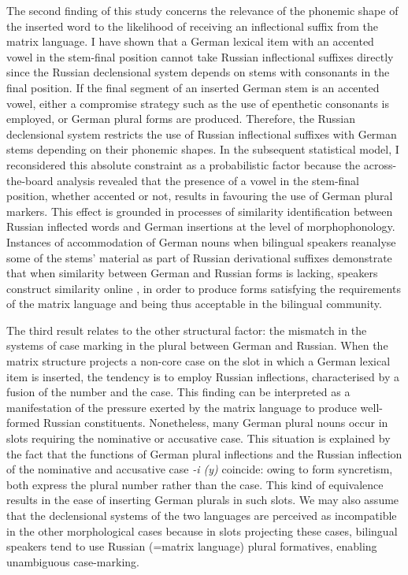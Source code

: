 The second finding of this study concerns the relevance of the phonemic shape of the inserted word to the likelihood of receiving an inflectional suffix from the matrix language. I have shown that a German lexical item with an accented vowel in the stem-final position cannot take Russian inflectional suffixes directly since the Russian declensional system depends on stems with consonants in the final position. If the final segment of an inserted German stem is an accented vowel, either a compromise strategy such as the use of epenthetic consonants is employed, or German plural forms are produced. Therefore, the Russian declensional system restricts the use of Russian inflectional suffixes with German stems depending on their phonemic shapes. In the subsequent statistical model, I reconsidered this absolute constraint as a probabilistic factor because the across-the-board analysis revealed that the presence of a vowel in the stem-final position, whether accented or not, results in favouring the use of German plural markers. This effect is grounded in processes of similarity identification between Russian inflected words and German insertions at the level of morphophonology. Instances of accommodation of German nouns when bilingual speakers reanalyse some of the stems' material as part of Russian derivational suffixes demonstrate that when similarity between German and Russian forms is lacking, speakers construct similarity online \citep[cf.][]{hakimov-backus-20-intro}, in order to produce forms satisfying the requirements of the matrix language and being thus acceptable in the bilingual community. 

The third result relates to the other structural factor: the mismatch in the systems of case marking in the plural between German and Russian. When the matrix structure projects a non-core case on the slot in which a German lexical item is inserted, the tendency is to employ Russian inflections, characterised by a fusion of the number and the case. This finding can be interpreted as a manifestation of the pressure exerted by the matrix language to produce well-formed Russian constituents. Nonetheless, many German plural nouns occur in slots requiring the nominative or accusative case. This situation is explained by the fact that the functions of German plural inflections and the Russian inflection of the nominative and accusative case \textit{-i (y)} coincide: owing to form syncretism, both express the plural number rather than the case. This kind of equivalence results in the ease of inserting German plurals in such slots. We may also assume that the declensional systems of the two languages are perceived as incompatible in the other morphological cases because in slots projecting these cases, bilingual speakers tend to use Russian (=matrix language) plural formatives, enabling unambiguous case-marking.

